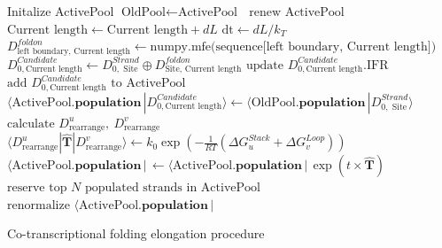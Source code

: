 \documentclass[11pt, a4paper]{article}
\begin{document}
\begin{algorithm}
  \begin{algorithmic}[1]
    \State Initalize ActivePool
      \State $\text{OldPool} \gets \text{ActivePool }$
      \State $\text{renew ActivePool }$
      \State $\text{Current length} \gets \text{Current length} + dL$
      \State $\text{dt} \gets dL / k_T$ 
        \State $D^{foldon}_{\text{left boundary}, \text{ Current length}} \gets \text{numpy.mfe(sequence[left boundary, Current length]})$
      \EndFor
          \State $D^{Candidate}_{0,\text{Current length}} \gets D^{Strand}_{0, \text{ Site}} \oplus D^{foldon}_{\text{Site}, \text{ Current length}}$
            \State $\text{update $D^{Candidate}_{0,\text{Current length}}$.IFR}$
          \Else
            \State $\text{add $D^{Candidate}_{0,\text{Current length}}$ to ActivePool}$
          \EndIf
            \State $\langle \text{ActivePool}.\textbf{population}\,|D^{Candidate}_{0,\text{Current length}}\rangle \gets \langle \text{OldPool}.\textbf{population}\,|D^{Strand}_{0, \text{ Site}}\rangle$
          \EndIf
        \EndFor
      \EndFor
        \State $\text{calculate  } D^{u}_{\text{rearrange}} ,\ D^{v}_{\text{rearrange}}$
        \State $\langle D^{u}_{\text{rearrange}} | \hat{\mathbf{T}} |D^{v}_{\text{rearrange}} \rangle \gets k_0 \exp(-\frac{1}{RT}(\Delta G^{Stack}_{u}+\Delta G^{Loop}_{v}) )$
      \EndFor
      \State $\langle \text{ActivePool}.\textbf{population}\,|\, \gets \langle \text{ActivePool}.\textbf{population}\,|\, \exp(t\times\hat{\mathbf{T}}) $
      \State $\text{reserve top $N$ populated strands in ActivePool}$
      \State $\text{renormalize }\langle \text{ActivePool}.\textbf{population}\,|$
    \EndWhile
  \end{algorithmic}
\caption{Co-transcriptional folding elongation procedure}\label{algorithm:1}
\end{algorithm}
\end{document}
